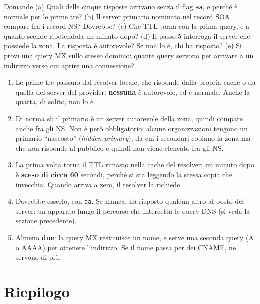 \begin{esercizio}{Domande}
(a) Quali delle cinque risposte arrivano senza il flag \texttt{aa}, e perché è normale per le prime tre?
(b) Il server primario nominato nel record SOA compare fra i record NS? Dovrebbe?
(c) Che TTL torna con la prima query, e a quanto scende ripetendola un minuto dopo?
(d) Il passo 5 interroga il server che possiede la zona. La risposta è autorevole? Se non lo è, chi ha risposto?
(e) Si provi una query MX sullo stesso dominio: quante query servono per arrivare a un indirizzo verso cui aprire
una connessione?

\svolgimento
\begin{enumerate}[label=(\alph*)]
    \item Le prime tre passano dal resolver locale, che risponde dalla propria cache o da quella del server del
          provider: \textbf{nessuna} è autorevole, ed è normale. Anche la quarta, di solito, non lo è.
    \item Di norma sì: il primario è un server autorevole della zona, quindi compare anche fra gli NS. Non è però
          obbligatorio: alcune organizzazioni tengono un primario ``nascosto'' (\emph{hidden primary}), da cui i
          secondari copiano la zona ma che non risponde al pubblico e quindi non viene elencato fra gli NS.
    \item La prima volta torna il TTL rimasto nella cache del resolver; un minuto dopo è \textbf{sceso di circa 60}
          secondi, perché si sta leggendo la stessa copia che invecchia. Quando arriva a zero, il resolver la richiede.
    \item Dovrebbe esserlo, con \texttt{aa}. Se manca, ha risposto qualcun altro al posto del server: un apparato
          lungo il percorso che intercetta le query DNS (si veda la sezione precedente).
    \item Almeno \textbf{due}: la query MX restituisce un nome, e serve una seconda query (A o AAAA) per ottenere
          l'indirizzo. Se il nome passa per dei CNAME, ne servono di più.
\end{enumerate}
\end{esercizio}

\section{Riepilogo}

